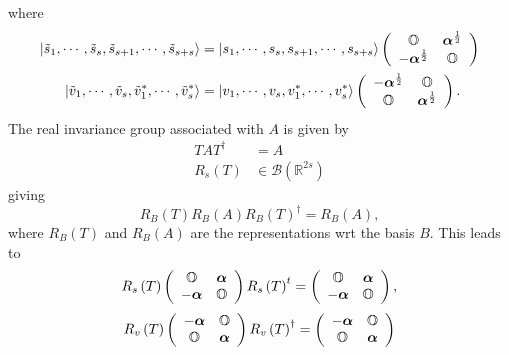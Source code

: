 \documentclass[aps,preprint]{revtex4}%
\begin{document}
where
\begin{align}
\left\vert \tilde{s}_{1},\cdots,\tilde{s}_{s},\tilde{s}_{s+1},\cdots,\tilde
{s}_{s+s}\right\rangle  &  =\left\vert s_{1},\cdots,s_{s},s_{s+1}%
,\cdots,s_{s+s}\right\rangle \left(
\begin{array}
[c]{cc}%
\mathbb{O} & \boldsymbol{\alpha}^{\frac{1}{2}}\\
-\boldsymbol{\alpha}^{\frac{1}{2}} & \mathbb{O}%
\end{array}
\right) \\
\left\vert \tilde{v}_{1},\cdots,\tilde{v}_{s},\tilde{v}_{1}^{\ast}%
,\cdots,\tilde{v}_{s}^{\ast}\right\rangle  &  =\left\vert v_{1},\cdots
,v_{s},v_{1}^{\ast},\cdots,v_{s}^{\ast}\right\rangle \left(
\begin{array}
[c]{cc}%
-\boldsymbol{\alpha}^{\frac{1}{2}} & \mathbb{O}\\
\mathbb{O} & \boldsymbol{\alpha}^{\frac{1}{2}}%
\end{array}
\right)  .
\end{align}
The real invariance group associated with $A$ is given by
\begin{align}
TAT^{\dagger}  &  =A\\
R_{s}\left(  T\right)   &  \in\mathcal{B}\left(  \mathbb{R}^{2s}\right)
\end{align}
giving
\begin{equation}
R_{B}\left(  T\right)  R_{B}\left(  A\right)  R_{B}\left(  T\right)
^{\dagger}=R_{B}\left(  A\right)  ,
\end{equation}
where $R_{B}\left(  T\right)  $ and $R_{B}\left(  A\right)  $ are the
representations wrt the basis $B.$ This leads to
\begin{equation}
R_{s}\left(  T\right)  \left(
\begin{array}
[c]{cc}%
\mathbb{O} & \boldsymbol{\alpha}\\
-\boldsymbol{\alpha} & \mathbb{O}%
\end{array}
\right)  R_{s}\left(  T\right)  ^{t}=\left(
\begin{array}
[c]{cc}%
\mathbb{O} & \boldsymbol{\alpha}\\
-\boldsymbol{\alpha} & \mathbb{O}%
\end{array}
\right)  ,
\end{equation}%
\begin{equation}
R_{v}\left(  T\right)  \left(
\begin{array}
[c]{cc}%
-\boldsymbol{\alpha} & \mathbb{O}\\
\mathbb{O} & \boldsymbol{\alpha}%
\end{array}
\right)  R_{v}\left(  T\right)  ^{\dagger}=\left(
\begin{array}
[c]{cc}%
-\boldsymbol{\alpha} & \mathbb{O}\\
\mathbb{O} & \boldsymbol{\alpha}%
\end{array}
\right)
\end{equation}
\end{document}
